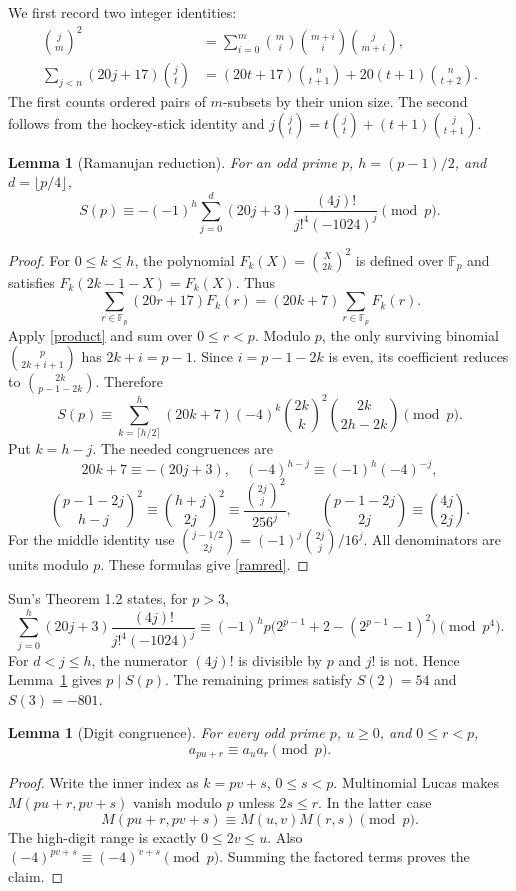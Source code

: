 \documentclass[11pt,a4paper]{article}
\newtheorem{lemma}[theorem]{Lemma}
\theoremstyle{remark}\newtheorem{remark}[theorem]{Remark}
\newcommand{\F}{\mathbb F}
\begin{document}
We first record two integer identities:
\begin{align}
 \binom jm^2
 &=\sum_{i=0}^m\binom mi\binom{m+i}i\binom j{m+i},
 \label{product}\\
 \sum_{j<n}(20j+17)\binom jt
 &=(20t+17)\binom n{t+1}
       +20(t+1)\binom n{t+2}. \label{hockey}
\end{align}
The first counts ordered pairs of \(m\)-subsets by their union size.
The second follows from the hockey-stick identity and
\(j\binom jt=t\binom jt+(t+1)\binom j{t+1}\).

\begin{lemma}[Ramanujan reduction]\label{primelemma}
For an odd prime \(p\), \(h=(p-1)/2\), and \(d=\lfloor p/4\rfloor\),
\begin{equation}\label{ramred}
 S(p)\equiv-(-1)^h\sum_{j=0}^{d}
       (20j+3)\frac{(4j)!}{j!^4(-1024)^j}\pmod p .
\end{equation}
\end{lemma}
\begin{proof}
For \(0\le k\le h\), the polynomial \(F_k(X)=\binom X{2k}^2\)
is defined over \(\F_p\) and satisfies
\(F_k(2k-1-X)=F_k(X)\). Thus
\[
 \sum_{r\in\F_p}(20r+17)F_k(r)
 =(20k+7)\sum_{r\in\F_p}F_k(r).
\]
Apply \eqref{product} and sum over \(0\le r<p\). Modulo \(p\), the
only surviving binomial \(\binom p{2k+i+1}\) has \(2k+i=p-1\).
Since \(i=p-1-2k\) is even, its coefficient reduces to
\(\binom{2k}{p-1-2k}\). Therefore
\[
 S(p)\equiv\sum_{k=\lceil h/2\rceil}^{h}
 (20k+7)(-4)^k\binom{2k}k^2\binom{2k}{2h-2k}\pmod p .
\]
Put \(k=h-j\). The needed congruences are
\[
 20k+7\equiv-(20j+3),\quad
 (-4)^{h-j}\equiv(-1)^h(-4)^{-j},
\]
\[
 \binom{p-1-2j}{h-j}^{\!2}
 \equiv\binom{h+j}{2j}^{\!2}
 \equiv\frac{\binom{2j}j^2}{256^j},\qquad
 \binom{p-1-2j}{2j}\equiv\binom{4j}{2j}.
\]
For the middle identity use
\(\binom{j-1/2}{2j}=(-1)^j\binom{2j}j/16^j\).
All denominators are units modulo \(p\). These formulas give
\eqref{ramred}.
\end{proof}

Sun's Theorem 1.2 \cite{SunRefinement} states, for \(p>3\),
\[
 \sum_{j=0}^{h}(20j+3)\frac{(4j)!}{j!^4(-1024)^j}
 \equiv(-1)^h p\bigl(2^{p-1}+2-(2^{p-1}-1)^2\bigr)\pmod {p^4}.
\]
For \(d<j\le h\), the numerator \((4j)!\) is divisible by \(p\)
and \(j!\) is not. Hence Lemma~\ref{primelemma} gives \(p\mid S(p)\).
The remaining primes satisfy \(S(2)=54\) and \(S(3)=-801\).

\begin{lemma}[Digit congruence]\label{lucas}
For every odd prime \(p\), \(u\ge0\), and \(0\le r<p\),
\[
                 a_{pu+r}\equiv a_u a_r\pmod p.
\]
\end{lemma}
\begin{proof}
Write the inner index as \(k=pv+s\), \(0\le s<p\).
Multinomial Lucas makes \(M(pu+r,pv+s)\) vanish modulo \(p\)
unless \(2s\le r\). In the latter case
\[
 M(pu+r,pv+s)\equiv M(u,v)M(r,s)\pmod p.
\]
The high-digit range is exactly \(0\le2v\le u\).
Also \((-4)^{pv+s}\equiv(-4)^{v+s}\pmod p\).
Summing the factored terms proves the claim.
\end{proof}
\end{document}
